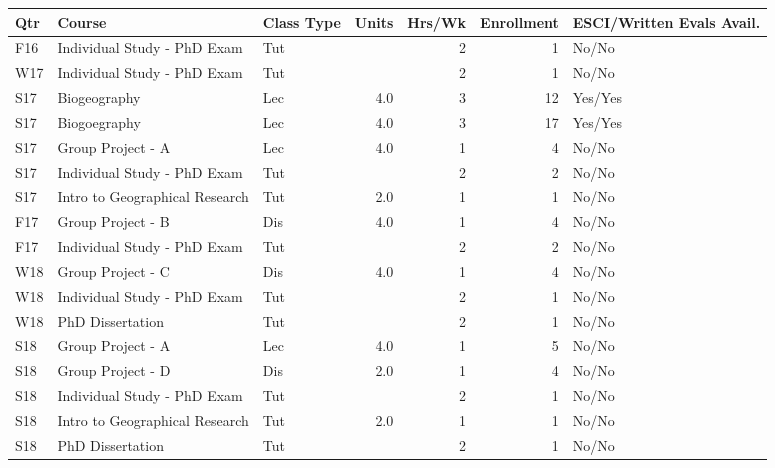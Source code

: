 
\begin{longtable}{lp{6.5cm}p{1cm}rrrp{2cm}}
Qtr & Course & Class Type & Units & Hrs/Wk & Enrollment & ESCI/Written Evals Avail.\\
\hline 
\endhead 
F16 & Individual Study - PhD Exam & Tut &  & 2 & 1 & No/No \\ 
W17 & Individual Study - PhD Exam & Tut &  & 2 & 1 & No/No \\ 
S17 & Biogeography & Lec & 4.0 & 3 & 12 & Yes/Yes \\ 
S17 & Biogoegraphy & Lec & 4.0 & 3 & 17 & Yes/Yes \\ 
S17 & Group Project - A & Lec & 4.0 & 1 & 4 & No/No \\ 
S17 & Individual Study - PhD Exam & Tut &  & 2 & 2 & No/No \\ 
S17 & Intro to Geographical Research & Tut & 2.0 & 1 & 1 & No/No \\ 
F17 & Group Project - B & Dis & 4.0 & 1 & 4 & No/No \\ 
F17 & Individual Study - PhD Exam & Tut &  & 2 & 2 & No/No \\ 
W18 & Group Project - C & Dis & 4.0 & 1 & 4 & No/No \\ 
W18 & Individual Study - PhD Exam & Tut &  & 2 & 1 & No/No \\ 
W18 & PhD Dissertation & Tut &  & 2 & 1 & No/No \\ 
S18 & Group Project - A & Lec & 4.0 & 1 & 5 & No/No \\ 
S18 & Group Project - D & Dis & 2.0 & 1 & 4 & No/No \\ 
S18 & Individual Study - PhD Exam & Tut &  & 2 & 1 & No/No \\ 
S18 & Intro to Geographical Research & Tut & 2.0 & 1 & 1 & No/No \\ 
S18 & PhD Dissertation & Tut &  & 2 & 1 & No/No \\ 
 
\end{longtable}

